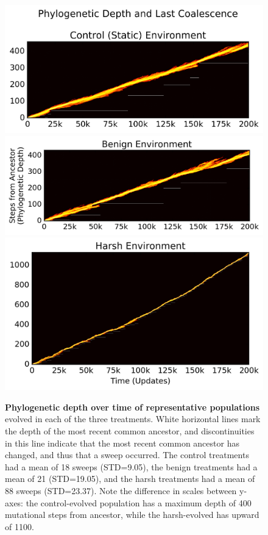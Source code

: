 \documentclass[letterpaper]{article}
\begin{document}
\begin{figure}[h!]
\begin{center}
\includegraphics[trim={-0.88cm 0 0.25cm 0},clip,width=1\columnwidth]{figures/control__phylodepth_with_coalescense.png}
\includegraphics[trim={0.2cm 0 0.25cm 0},clip,width=1\columnwidth]{figures/benign__phylodepth_with_coalescense.png}
\includegraphics[trim={-0.63cm 0 0.25cm 0},clip,width=1\columnwidth]{figures/harsh__phylodepth_with_coalescense.png}

\caption{\textbf{Phylogenetic depth over time of representative populations} evolved in each of the three treatments. White horizontal lines mark the depth of the most recent common ancestor, and discontinuities in this line indicate that the most recent common ancestor has changed, and thus that a sweep occurred. The control treatments had a mean of 18 sweeps (STD=9.05), the benign treatments had a mean of 21 (STD=19.05), and the harsh treatments had a mean of 88 sweeps (STD=23.37). Note the difference in scales between y-axes: the control-evolved population has a maximum depth of 400 mutational steps from ancestor, while the harsh-evolved has upward of 1100. %
}\label{fig:flamegraph}
\end{center}
\end{figure}
\end{document}
